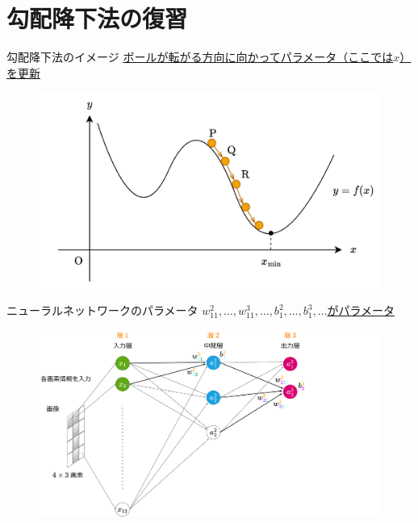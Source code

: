 \documentclass[dvipdfmx,aspectratio=169]{beamer}
\begin{document}
	\section{勾配降下法の復習}
	\begin{frame}{勾配降下法のイメージ}
		\underline{ボールが転がる方向に向かってパラメータ（ここでは$ x $）を更新}
		
		\begin{figure}
			\centering
			\includegraphics[width=0.7\linewidth]{img/image-of-a-ball-rolling-down-a-slope}
		\end{figure}
		
	\end{frame}
	\begin{frame}{ニューラルネットワークのパラメータ}
		\underline{$ w^2_{11}, \dots, w^3_{11}, \dots, b^2_1, \dots, b^3_1, \dots $がパラメータ}
		\begin{figure}
			\centering
			\includegraphics[width=0.8\linewidth]{img/illustration-of-variable-and-parameter-names}
		\end{figure}
	\end{frame}
\end{document}
